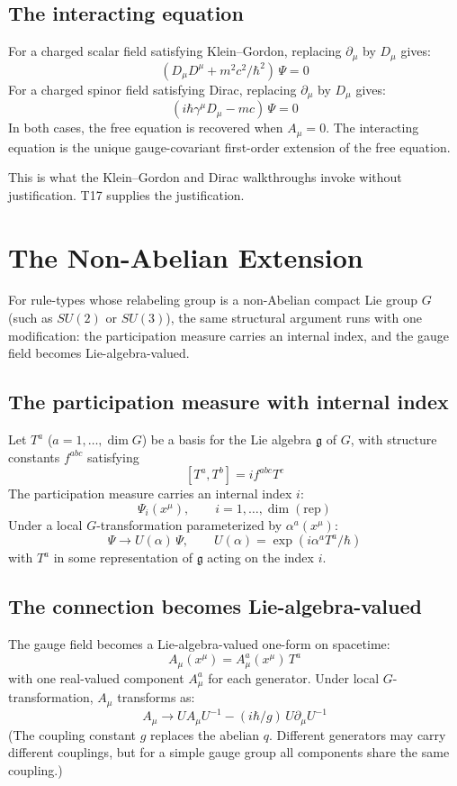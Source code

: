 \documentclass[11pt,a4paper]{article}
\begin{document}
\subsection{The interacting equation}

For a charged scalar field satisfying Klein--Gordon, replacing $\partial_\mu$ by $D_\mu$ gives:
\[
(D_\mu D^\mu + m^{2}c^{2}/\hbar^{2})\, \Psi = 0
\]
For a charged spinor field satisfying Dirac, replacing $\partial_\mu$ by $D_\mu$ gives:
\[
(i\hbar\gamma^\mu D_\mu - mc)\, \Psi = 0
\]
In both cases, the free equation is recovered when $A_\mu = 0$. The interacting equation is the unique gauge-covariant first-order extension of the free equation.

This is what the Klein--Gordon and Dirac walkthroughs invoke without justification. T17 supplies the justification.

\section{The Non-Abelian Extension}

For rule-types whose relabeling group is a non-Abelian compact Lie group $G$ (such as $SU(2)$ or $SU(3)$), the same structural argument runs with one modification: the participation measure carries an internal index, and the gauge field becomes Lie-algebra-valued.

\subsection{The participation measure with internal index}

Let $T^a$ ($a = 1, \ldots, \dim G$) be a basis for the Lie algebra $\mathfrak{g}$ of $G$, with structure constants $f^{abc}$ satisfying
\[
[T^a, T^b] = i f^{abc} T^c
\]
The participation measure carries an internal index $i$:
\[
\Psi_i(x^\mu), \qquad i = 1, \ldots, \dim(\text{rep})
\]
Under a local $G$-transformation parameterized by $\alpha^a(x^\mu)$:
\[
\Psi \to U(\alpha)\, \Psi, \qquad U(\alpha) = \exp(i \alpha^a T^a / \hbar)
\]
with $T^a$ in some representation of $\mathfrak{g}$ acting on the index $i$.

\subsection{The connection becomes Lie-algebra-valued}

The gauge field becomes a Lie-algebra-valued one-form on spacetime:
\[
A_\mu(x^\mu) = A_\mu^a(x^\mu)\, T^a
\]
with one real-valued component $A_\mu^a$ for each generator. Under local $G$-transformation, $A_\mu$ transforms as:
\[
A_\mu \to U A_\mu U^{-1} - (i\hbar/g)\, U \partial_\mu U^{-1}
\]
(The coupling constant $g$ replaces the abelian $q$. Different generators may carry different couplings, but for a simple gauge group all components share the same coupling.)
\end{document}

